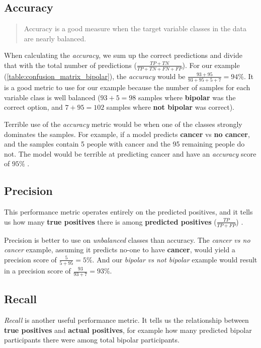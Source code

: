 \subsection{Accuracy}

\blockquote[\cite{ml_metrics}]{Accuracy is a good measure when the target variable classes in the data are nearly balanced.}

When calculating the \textit{accuracy}, we sum up the correct predictions and divide that with the total number of predictions 
($ \frac{TP + TN}{TP + TN + FN + FP} $).
For our example (\ref{table:confusion_matrix_bipolar}), the \textit{accuracy} would be 
$ \frac{93 + 95}{93 + 95 + 5 + 7} = 94\% $. 
It is a good metric to use for our example because the number of samples for each variable class is well balanced 
($ 93+5=98 $ samples where \textbf{bipolar} was the correct option, and $ 7+95=102 $ samples where \textbf{not bipolar} was correct).

Terrible use of the \textit{accuracy} metric would be when one of the classes strongly dominates the samples. 
For example, if a model predicts \textbf{cancer} vs \textbf{no cancer}, and the samples contain 5 people with cancer and 
the 95 remaining people do not. The model would be terrible at predicting cancer and have an \textit{accuracy} score of $ 95\% $ \cite{ml_metrics}.

\subsection{Precision}

This performance metric operates entirely on the predicted positives, and it tells us how many \textbf{true positives} there is among 
\textbf{predicted positives} ($ \frac{TP}{TP + FP} $) \cite{ml_metrics}. 

Precision is better to use on \textit{unbalanced} classes than accuracy. The \textit{cancer vs no cancer} example, assuming it 
predicts no-one to have \textbf{cancer}, would yield a precision score of $ \frac{5}{5+95} = 5\% $. And our \textit{bipolar vs not bipolar} example
would result in a precision score of $ \frac{93}{93+7} = 93\% $.

\subsection{Recall}

\textit{Recall} is another useful performance metric. It tells us the relationship between \textbf{true positives} and \textbf{actual positives},
for example how many predicted bipolar participants there were among total bipolar participants.

